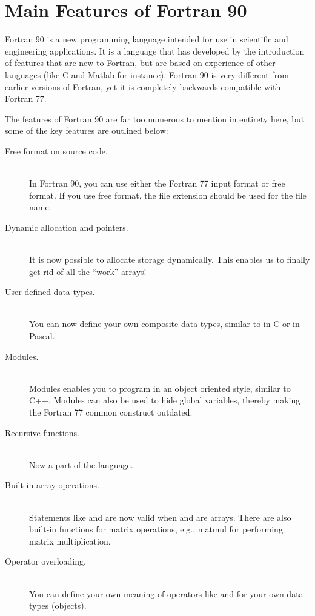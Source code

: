 \section{Main Features of Fortran 90}

Fortran 90 is a new programming language intended for use in scientific
and engineering applications. It is a language that has developed by the
introduction of features that are new to Fortran, but are based on
experience of other languages (like C and Matlab for instance). Fortran
90 is very different from earlier versions of Fortran, yet it is
completely backwards compatible with Fortran 77.

The features of Fortran 90 are far too numerous to mention in entirety
here, but some of the key features are outlined below:

\newcommand{\descitem}[2]{\item[\normalfont{}#1] \hfill \\ #2}
\begin{description}
    \descitem{Free format on source code.}{
        In Fortran 90, you can use either the Fortran 77 input format or
        free format. If you use free format, the file extension
        \inlinecode{.f90} should be used for the file name.
    }

    \descitem{Dynamic allocation and pointers.}{
        It is now possible to allocate storage dynamically. This enables
        us to finally get rid of all the ``work'' arrays!
    }

    \descitem{User defined data types.}{
        You can now define your own composite data types, similar to
        \inlinekeyword{struct} in C or \inlinekeyword{record} in Pascal.
    }

    \descitem{Modules.}{
        Modules enables you to program in an object oriented style,
        similar to C++. Modules can also be used to hide global
        variables, thereby making the Fortran 77 common construct
        outdated.
    }

    \descitem{Recursive functions.}{
        Now a part of the language.
    }

    \descitem{Built-in array operations.}{
        Statements like \inlinefortrann{A=0} and \inlinefortrann{C=A+B}
        are now valid when \inlinefortrann{A} and \inlinefortrann{B} are
        arrays. There are also built-in functions for matrix operations,
        e.g., matmul for performing matrix multiplication.
    }

    \descitem{Operator overloading.}{
        You can define your own meaning of operators like
        \inlinefortrann{+} and \inlinefortrann{=} for your own data
        types (objects).
    }
\end{description}

